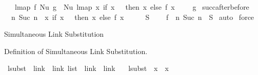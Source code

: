 \begin{isabellebody}
\ {\isacharbar}{\kern0pt}\ \ {\isachardoublequoteopen}lmap\ f\ {\isacharparenleft}{\kern0pt}Nu\ g{\isacharparenright}{\kern0pt}\ {\isacharequal}{\kern0pt}\ Nu\ {\isacharparenleft}{\kern0pt}lmap\ {\isacharparenleft}{\kern0pt}{\isasymlambda}x{\isachardot}{\kern0pt}\ if\ x\ {\isacharequal}{\kern0pt}\ {}\ then\ x\ else\ {\isacharparenleft}{\kern0pt}f\ {\isacharparenleft}{\kern0pt}x\ {\isacharminus}{\kern0pt}\ {}{\isacharparenright}{\kern0pt}\ {\isacharplus}{\kern0pt}\ {}{\isacharparenright}{\kern0pt}{\isacharparenright}{\kern0pt}\ g{\isacharparenright}{\kern0pt}{\isachardoublequoteclose}\isanewline
\isanewline
\isanewline
{}\isamarkupfalse%
\ succ{\isacharunderscore}{\kern0pt}after{\isacharunderscore}{\kern0pt}before{\isacharcolon}{\kern0pt}\isanewline
\ \ {\isachardoublequoteopen}{\isacharbraceleft}{\kern0pt}n{\isachardot}{\kern0pt}\ Suc\ n\ {\isasymin}\ {\isacharparenleft}{\kern0pt}{\isasymlambda}x{\isachardot}{\kern0pt}\ if\ x\ {\isacharequal}{\kern0pt}\ {}\ then\ x\ else\ {\isacharparenleft}{\kern0pt}f\ {\isacharparenleft}{\kern0pt}x\ {\isacharminus}{\kern0pt}\ {}{\isacharparenright}{\kern0pt}\ {\isacharplus}{\kern0pt}\ {}{\isacharparenright}{\kern0pt}{\isacharparenright}{\kern0pt}\ {\isacharbackquote}{\kern0pt}\ S{\isacharbraceright}{\kern0pt}\ {\isacharequal}{\kern0pt}\isanewline
\ \ \ f\ {\isacharbackquote}{\kern0pt}\ {\isacharbraceleft}{\kern0pt}n{\isachardot}{\kern0pt}\ Suc\ n\ {\isasymin}\ S{\isacharbraceright}{\kern0pt}{\isachardoublequoteclose}\isanewline
%
\isadelimproof
%
\endisadelimproof
%
\isatagproof
{}\isamarkupfalse%
\ auto\isanewline
{}\isamarkupfalse%
\ force%
\endisatagproof
{\isafoldproof}%
%
\isadelimproof
%
\endisadelimproof
%
\begin{isamarkuptext}%
Simultaneous Link Substitution%
\end{isamarkuptext}\isamarkuptrue%
%
\begin{isamarkuptext}%
Definition of Simultaneous Link Substitution.%
\end{isamarkuptext}\isamarkuptrue%
\isamarkupfalse%
\ lsubst\ {\isacharcolon}{\kern0pt}{\isacharcolon}{\kern0pt}\ {\isachardoublequoteopen}{\isacharparenleft}{\kern0pt}link\ {\isacharasterisk}{\kern0pt}\ link{\isacharparenright}{\kern0pt}\ list\ {\isacharequal}{\kern0pt}{\isachargreater}{\kern0pt}\ link\ {\isacharequal}{\kern0pt}{\isachargreater}{\kern0pt}\ link{\isachardoublequoteclose}\ \isanewline
\ \ {\isachardoublequoteopen}lsubst\ {\isacharbrackleft}{\kern0pt}{\isacharbrackright}{\kern0pt}\ x\ {\isacharequal}{\kern0pt}\ x{\isachardoublequoteclose}\ {\isacharbar}{\kern0pt}\isanewline

\end{isabellebody}
